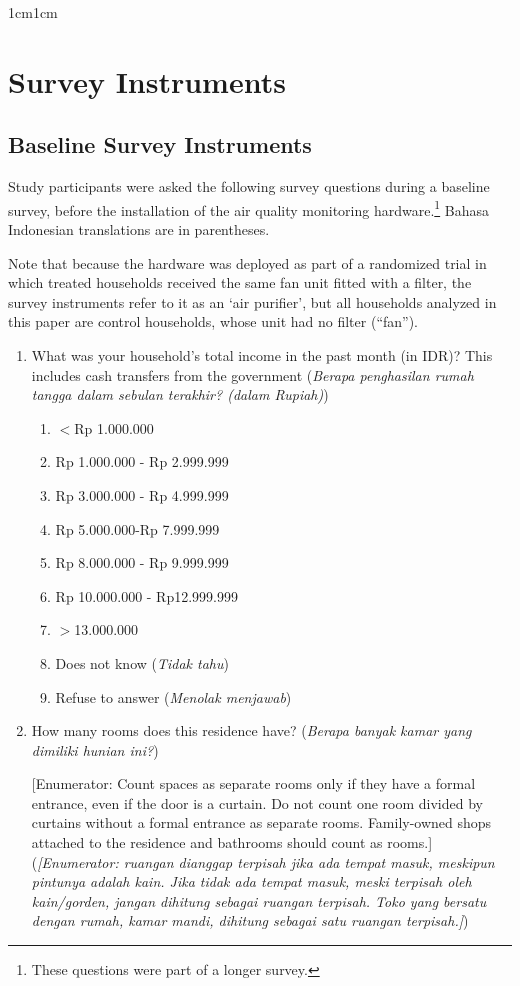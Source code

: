 \documentclass[9pt,twoside]{pnas-new}
\begin{document}
\SItext
\begin{adjustwidth}{1cm}{1cm} 
\section*{Survey Instruments}

\subsection*{Baseline Survey Instruments}

Study participants were asked the following survey questions during a baseline survey, before the installation of the air quality monitoring hardware.\footnote{These questions were part of a longer survey.} Bahasa Indonesian translations are in parentheses.

Note that because the hardware was deployed as part of a randomized trial in which treated households received the same fan unit fitted with a filter, the survey instruments refer to it as an `air purifier', but all households analyzed in this paper are control households, whose unit had no filter (``fan'').

\begin{enumerate}
\item What was your household's total income in the past month (in IDR)? This includes cash transfers from the government (\textit{Berapa penghasilan rumah tangga dalam sebulan terakhir? (dalam Rupiah)})
\begin{enumerate}
    \item $<$Rp 1.000.000
    \item Rp 1.000.000 - Rp 2.999.999
    \item Rp 3.000.000 - Rp 4.999.999
    \item Rp 5.000.000-Rp 7.999.999
    \item Rp 8.000.000 - Rp 9.999.999
    \item Rp 10.000.000 - Rp12.999.999
    \item $>$13.000.000
        \item Does not know (\textit{Tidak tahu})
        \item Refuse to answer (\textit{Menolak menjawab})
\end{enumerate}
\item How many rooms does this residence have? (\textit{Berapa banyak kamar yang dimiliki hunian ini?})

[Enumerator: Count spaces as separate rooms only if they have a formal entrance, even if the door is a curtain. Do not count one room divided by curtains without a formal entrance as separate rooms. Family-owned shops attached to the residence and bathrooms should count as rooms.] \\ 
(\textit{[Enumerator: ruangan dianggap terpisah jika ada tempat masuk, meskipun pintunya adalah kain. Jika tidak ada tempat masuk, meski terpisah oleh kain/gorden, jangan dihitung sebagai ruangan terpisah. Toko yang bersatu dengan rumah, kamar mandi, dihitung sebagai satu ruangan terpisah.]})


\end{enumerate}
\end{adjustwidth}
\end{document}
